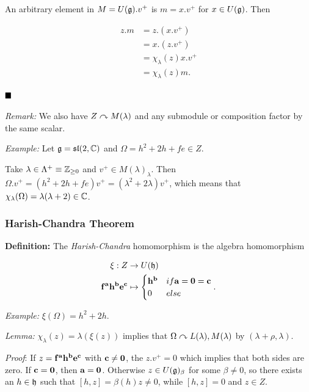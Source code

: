 An arbitrary element in \(M = U({\mathfrak{g}}).v^+\) is \(m=x.v^+\) for
\(x\in U({\mathfrak{g}})\). Then

\begin{align*}
z.m &= z.(x.v^+) \\
&= x.(z.v^+) \\
&= \chi_\lambda(z) x.v^+ \\
&= \chi_\lambda (z) m
.\end{align*}

\(\qed\)

\emph{Remark:} We also have \(Z\curvearrowright M(\lambda)\) and any submodule or
composition factor by the same scalar.

\emph{Example:} Let \({\mathfrak{g}} = {\mathfrak{sl}}(2, {\mathbb{C}})\) and
\(\Omega = h^2 + 2h + fe \in Z\).

Take \(\lambda \in \Lambda^+ \equiv {\mathbb{Z}}_{\geq 0}\) and
\(v^+ \in M(\lambda)_\lambda\). Then
\(\Omega.v^+ = (h^2 + 2h + fe)v^+ = (\lambda^2 + 2\lambda)v^+\), which
means that \(\chi_\lambda(\Omega) = \lambda(\lambda+2) \in {\mathbb{C}}\).

\hypertarget{harish-chandra-theorem}{%
\subsubsection{Harish-Chandra Theorem}\label{harish-chandra-theorem}}

\textbf{Definition:} The \emph{Harish-Chandra} homomorphism is the
algebra homomorphism

\begin{align*}
\xi: Z &\to U({\mathfrak{h}}) \\
\mathbf{f}^{\mathbf{a}} \mathbf{h}^{\mathbf{b}} \mathbf{e}^{\mathbf{c}} &\mapsto 
\begin{cases}
\mathbf{h}^{\mathbf{b}} & if \mathbf{a} = \mathbf{0} = \mathbf{c} \\
0 & else
\end{cases}
.\end{align*}

\emph{Example:} \(\xi(\Omega) = h^2 + 2h\).

\emph{Lemma:} \(\chi_\lambda(z) = \lambda(\xi(z))\) implies that
\(\Omega \curvearrowright L(\lambda), M(\lambda)\) by
\((\lambda + \rho, \lambda)\).

\emph{Proof}: If
\(z = \mathbf{f}^{\mathbf{a}}\mathbf{h}^{\mathbf{b}}\mathbf{e}^{\mathbf{c}}\)
with \(\mathbf{c} \neq \mathbf{0}\), the \(z.v^+ = 0\) which implies that
both sides are zero. If \(\mathbf{c} = \mathbf{0}\), then
\(\mathbf{a} = \mathbf{0}\). Otherwise \(z\in U({\mathfrak{g}})_\beta\) for some
\(\beta\neq 0\), so there exists an \(h\in{\mathfrak{h}}\) such that
\([h, z] = \beta(h) z \neq 0\), while \([h, z] = 0\) and \(z\in Z\).

